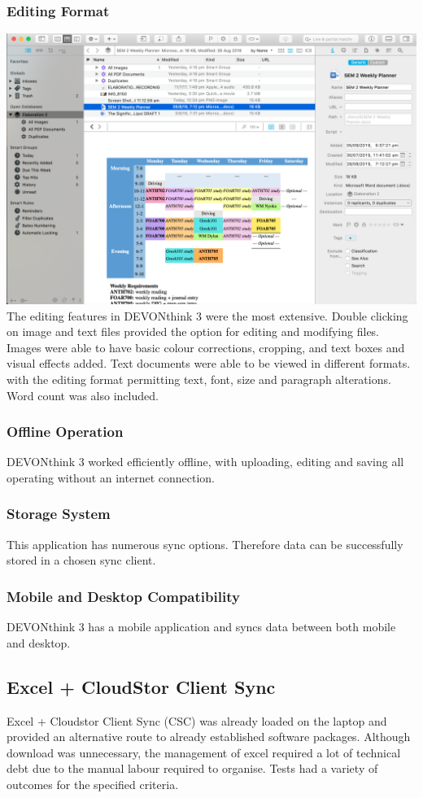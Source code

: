 \documentclass{article}
\begin{document}
\subsubsection{Editing Format}
\includegraphics[width=\textwidth]{DevonInterface.png}
The editing features in DEVONthink 3 were the most extensive. Double clicking on image and text files provided the option for editing and modifying files. Images were able to have basic colour corrections, cropping, and text boxes and visual effects added. Text documents were able to be viewed in different formats. with the editing format permitting text, font, size and paragraph alterations. Word count was also included.
\subsubsection{Offline Operation}
DEVONthink 3 worked efficiently offline, with uploading, editing and saving all operating without an internet connection.
\subsubsection{Storage System}
This application has numerous sync options. Therefore data can be successfully stored in a chosen sync client. 
\subsubsection{Mobile and Desktop Compatibility}
DEVONthink 3 has a mobile application and syncs data between both mobile and desktop.

\subsection{Excel + CloudStor Client Sync}
Excel + Cloudstor Client Sync (CSC) was already loaded on the laptop and provided an alternative route to already established software packages. Although download was unnecessary, the management of excel required a lot of technical debt due to the manual labour required to organise. Tests had a variety of outcomes for the specified criteria.
\end{document}
